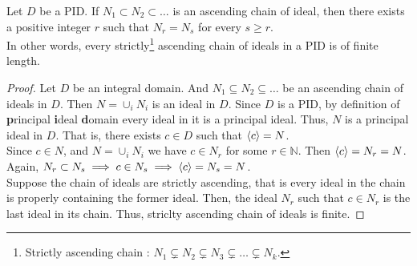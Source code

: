 \begin{lemma}
	Let $D$ be a PID.
	If $N_1 \subset N_2 \subset \dots$ is an ascending chain of ideal, then there exists a positive integer $r$ such that $N_r = N_s$ for every $s \ge r$.\\

	In other words, every strictly\dag\footnote{
		Strictly ascending chain : $N_1 \subsetneq N_2 \subsetneq N_3 \subsetneq \dots \subsetneq N_k$.}
	ascending chain of ideals in a PID is of finite length.
\end{lemma}
\begin{proof}
	Let $D$ be an integral domain.
	And $N_1 \subseteq N_2 \subseteq \dots$ be an ascending chain of ideals in $D$.
	Then $N = \cup_i N_i$ is an ideal in $D$.
	Since $D$ is a PID, by definition of \textbf{p}rincipal \textbf{i}deal \textbf{d}omain every ideal in it is a principal ideal.
	Thus, $N$ is a principal ideal in $D$.
	That is, there exists $c \in D$ such that $\langle c\rangle = N$.\\

	Since $c \in N$, and $N = \cup_i N_i$ we have $c \in N_r$ for some $r \in \mathbb{N}$.
	Then $\langle c\rangle = N_r = N$.
	Again, $N_r \subset N_s \implies c \in N_s \implies \langle c\rangle = N_s = N$.\\

	Suppose the chain of ideals are strictly ascending, that is every ideal in the chain is properly containing the former ideal.
	Then, the ideal $N_r$ such that $c \in N_r$ is the last ideal in its chain.
	Thus, striclty ascending chain of ideals is finite.
\end{proof}

